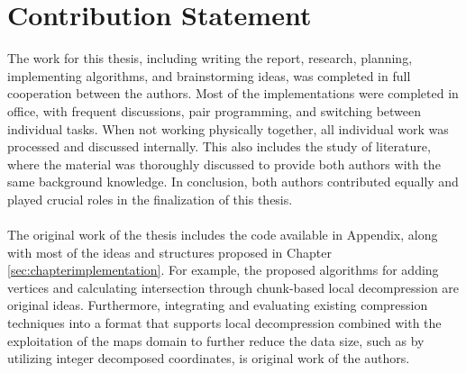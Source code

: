 \section{Contribution Statement}
The work for this thesis, including writing the report, research, planning, implementing algorithms, and brainstorming ideas, was completed in full cooperation between the authors. Most of the implementations were completed in office, with frequent discussions, pair programming, and switching between individual tasks. When not working physically together, all individual work was processed and discussed internally. This also includes the study of literature, where the material was thoroughly discussed to provide both authors with the same background knowledge. In conclusion, both authors contributed equally and played crucial roles in the finalization of this thesis.
\\\\
The original work of the thesis includes the code available in Appendix, along with most of the ideas and structures proposed in Chapter \ref{sec:chapterimplementation}. For example, the proposed algorithms for adding vertices and calculating intersection through chunk-based local decompression are original ideas. Furthermore, integrating and evaluating existing compression techniques into a format that supports local decompression combined with the exploitation of the maps domain to further reduce the data size, such as by utilizing integer decomposed coordinates, is original work of the authors.
